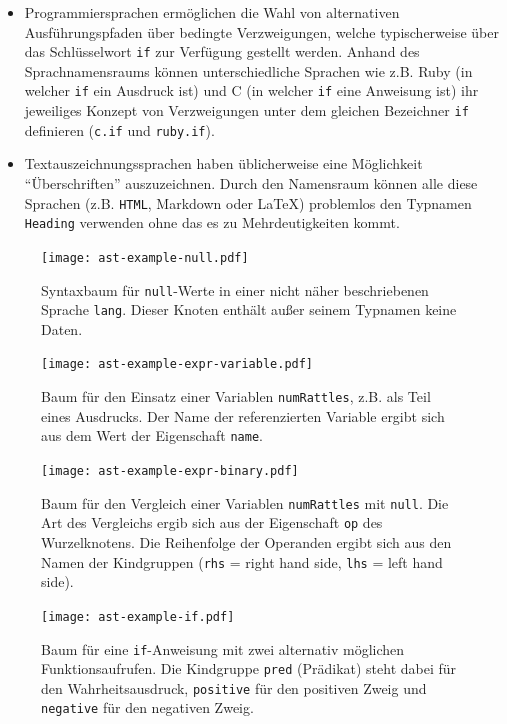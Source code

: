 \documentclass[paper=a4,fontsize=12pt,parskip=half]{scrartcl}
\begin{document}
\begin{itemize}
\item Programmiersprachen ermöglichen die Wahl von alternativen Ausführungspfaden  über bedingte Verzweigungen, welche typischerweise über das Schlüsselwort \texttt{if} zur Verfügung gestellt werden. Anhand des Sprachnamensraums können unterschiedliche Sprachen wie z.B. Ruby (in welcher \texttt{if} ein Ausdruck ist) und C (in welcher \texttt{if} eine Anweisung ist) ihr jeweiliges Konzept von Verzweigungen unter dem gleichen Bezeichner \texttt{if} definieren (\texttt{c.if} und \texttt{ruby.if}).
\item Textauszeichnungssprachen haben üblicherweise eine Möglichkeit \enquote{Überschriften} auszuzeichnen. Durch den Namensraum können alle diese Sprachen (z.B. \texttt{HTML}, Markdown oder \LaTeX) problemlos den Typnamen \texttt{Heading} verwenden ohne das es zu Mehrdeutigkeiten kommt.
\end{itemize}

\begin{figure}[p]
  \centering\texttt{[image: ast-example-null.pdf]}
  \caption{Syntaxbaum für \texttt{null}-Werte in einer nicht näher beschriebenen Sprache \texttt{lang}. Dieser Knoten enthält außer seinem Typnamen keine Daten.}
  \label{fig:ast-example-null}
\end{figure}

\begin{figure}[p]
  \centering\texttt{[image: ast-example-expr-variable.pdf]}
  \caption{Baum für den Einsatz einer Variablen \texttt{numRattles}, z.B. als Teil eines Ausdrucks. Der Name der referenzierten Variable ergibt sich aus dem Wert der Eigenschaft \texttt{name}.}
  \label{fig:ast-example-variable}
\end{figure}

\begin{figure}[p]
  \centering\texttt{[image: ast-example-expr-binary.pdf]}
  \caption{Baum für den Vergleich einer Variablen \texttt{numRattles} mit \texttt{null}. Die Art des Vergleichs ergib sich aus der Eigenschaft \texttt{op} des Wurzelknotens. Die Reihenfolge der Operanden ergibt sich aus den Namen der Kindgruppen (\texttt{rhs} = right hand side, \texttt{lhs} = left hand side).}
  \label{fig:ast-example-binary}
\end{figure}

\begin{figure}[p]
  \centering\texttt{[image: ast-example-if.pdf]}
  \caption{Baum für eine \texttt{if}-Anweisung mit zwei alternativ möglichen Funktionsaufrufen. Die Kindgruppe \texttt{pred} (Prädikat) steht dabei für den Wahrheitsausdruck, \texttt{positive} für den positiven Zweig und \texttt{negative} für den negativen Zweig.}
  \label{fig:ast-example-if}
\end{figure}
\end{document}
